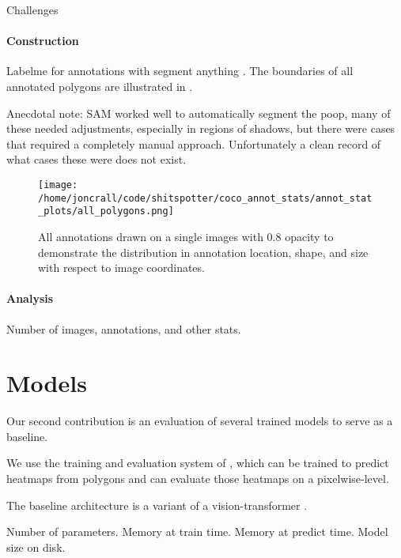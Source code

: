\documentclass[10pt,twocolumn,letterpaper]{article}
\begin{document}
Challenges

\paragraph{Construction}

Labelme \cite{wada_labelmeailabelme_nodate} for annotations with segment anything \cite{kirillov_segment_2023}.
The boundaries of all annotated polygons are illustrated in .

Anecdotal note: SAM worked well to automatically segment the poop, many of
these needed adjustments, especially in regions of shadows, but there were
cases that required a completely manual approach. Unfortunately a clean record
of what cases these were does not exist. 


\begin{figure}[h]
\centering
\texttt{[image: /home/joncrall/code/shitspotter/coco\_annot\_stats/annot\_stat\_plots/all\_polygons.png]}
\caption[]{
    All annotations drawn on a single images with 0.8 opacity to demonstrate
    the distribution in annotation location, shape, and size with respect to
    image coordinates.
}
\label{fig:AllPolygons}
\end{figure}

\paragraph{Analysis}

Number of images, annotations, and other stats.


\section{Models}

Our second contribution is an evaluation of several trained models to serve as
a baseline.

We use the training and evaluation system of \cite{Greenwell_2024_WACV}, which
can be trained to predict heatmaps from polygons and can evaluate those
heatmaps on a pixelwise-level. 

The baseline architecture is a variant of a vision-transformer \cite{vit,split-attention,greenwell_watch_2024}.

Number of parameters.
Memory at train time.
Memory at predict time.
Model size on disk.
\end{document}
